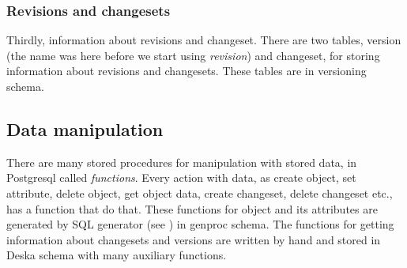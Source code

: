 \documentclass[deska]{subfiles}
\begin{document}
\subsubsection{Revisions and changesets}
Thirdly, information about revisions and changeset. There are two tables, version (the name was here before
we start using {\em revision}) and changeset, for storing information about revisions and changesets. These tables are
in versioning schema.

\subsection{Data manipulation}
There are many stored procedures for manipulation with stored data, in Postgresql called {\em functions}.
Every action with data, as create object, set attribute, delete object, get object data, create changeset, delete changeset etc.,
has a function that do that. These functions for object and its attributes are generated by SQL generator (see ) in genproc schema.
The functions for getting information about changesets and versions are written by hand and stored in Deska schema with many auxiliary functions.
\end{document}
